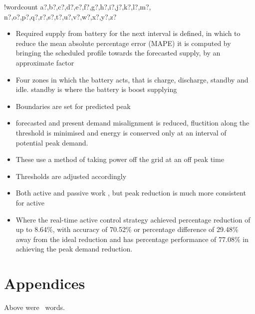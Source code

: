\documentclass[10pt]{article}
\providecommand{\tightlist}{%
  \setlength{\itemsep}{0pt}\setlength{\parskip}{0pt}}
\newcounter{words}
\newenvironment{counted}{%
  \setcounter{words}{0}
  \SearchList!{wordcount}{\stepcounter{words}}
    {a?,b?,c?,d?,e?,f?,g?,h?,i?,j?,k?,l?,m?,
    n?,o?,p?,q?,r?,s?,t?,u?,v?,w?,x?,y?,z?}
  \UndoBoundary{'}
  \SearchOrder{p;}}{%
  \StopSearching}
\begin{document}
\begin{counted}
\begin{itemize}
  \begin{itemize}
  \tightlist
  \item
    Required supply from battery for the next interval is defined, in
    which to reduce the mean absolute percentage error (MAPE) it is
    computed by bringing the scheduled profile towards the forecasted
    supply, by an approximate factor
  \item
    Four zones in which the battery acts, that is charge, discharge,
    standby and idle. standby is where the battery is boost supplying
  \item
    Boundaries are set for predicted peak
  \item
    forecasted and present demand misalignment is reduced, fluctition
    along the threshold is minimised and energy is conserved only at an
    interval of potential peak demand.
  \item
    These use a method of taking power off the grid at an off peak time
  \item
    Thresholds are adjusted accordingly
  \item
    Both active and passive work , but peak reduction is much more
    consistent for active
  \item
    Where the real-time active control strategy achieved percentage
    reduction of up to 8.64\%, with accuracy of 70.52\% or percentage
    difference of 29.48\% away from the ideal reduction and has
    percentage performance of 77.08\% in achieving the peak demand
    reduction.
  \end{itemize}
\end{itemize}

\end{counted} %

\newpage
\section{Appendices}
Above were \thewords\ words. %
\newpage

% 

\printbibliography
\end{document}
